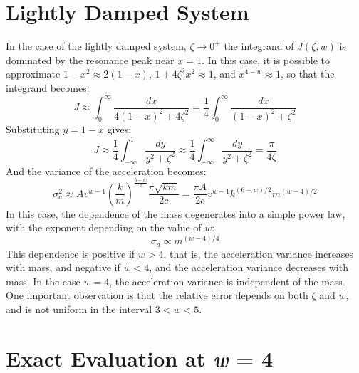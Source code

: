\section{Lightly Damped System} \label{sec:lightly-damped-system}

In the case of the lightly damped system, $\zeta \rightarrow 0^+$ the integrand of $J(\zeta, w)$ is dominated by the resonance peak near $x = 1$. In this case, it is possible to approximate $1 - x^2 \approx 2(1 - x)$, $1+4\zeta^2 x^2 \approx 1$, and $x^{4-w} \approx 1$, so that the integrand becomes:
\begin{equation}
    J \approx \int_{0}^{\infty} \frac{dx}{4(1-x)^2 + 4\zeta^2} = \frac{1}{4} \int_{0}^{\infty} \frac{dx}{(1-x)^2 + \zeta^2}
\end{equation}
Substituting $y = 1-x$ gives:
\begin{equation}
    J \approx \frac{1}{4} \int_{-\infty}^{1} \frac{dy}{y^2 + \zeta^2} \approx \frac{1}{4} \int_{-\infty}^{\infty} \frac{dy}{y^2 + \zeta^2} = \frac{\pi}{4\zeta}
\end{equation}
And the variance of the acceleration becomes:
\begin{equation}
    \sigma^2_{a} \approx A v^{w-1} \left(\frac{k}{m}\right)^{\frac{5-w}{2}} \frac{\pi\sqrt{km}}{2c} = \frac{\pi A}{2c} v^{w-1} k^{(6-w)/2} m^{(w-4)/2}
\end{equation}
In this case, the dependence of the mass degenerates into a simple power law, with the exponent depending on the value of $w$:
\begin{equation}
    \sigma_{a} \propto m^{(w-4)/4}
\end{equation} 
This dependence is positive if $w > 4$, that is, the acceleration variance increases with mass, and negative if $w < 4$, and the acceleration variance decreases with mass. In the case $w = 4$, the acceleration variance is independent of the mass. One important observation is that the relative error depends on both $\zeta$ and $w$, and is not uniform in the interval $3 < w < 5$. 

\section{Exact Evaluation at \textit{w} = 4} \label{sec:exact-evaluation-w-4}

